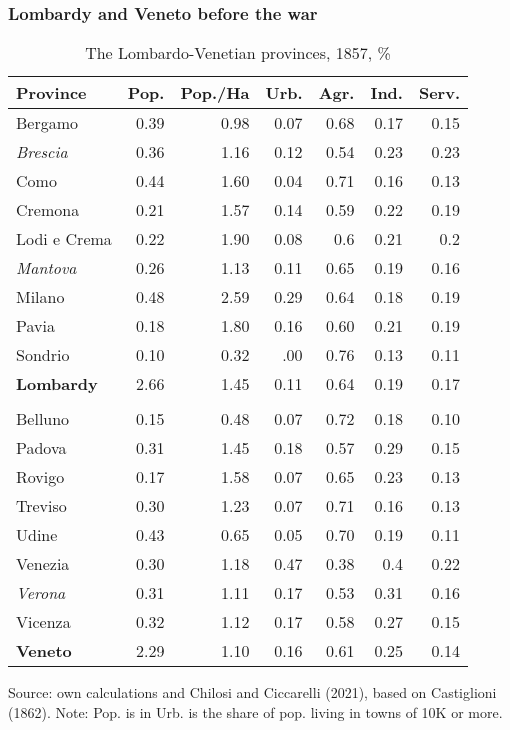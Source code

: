 \documentclass[10pt]{beamer}
\begin{document}
\begin{frame}
    \frametitle{Lombardy and Veneto before the war}

\begin{table}[!h]
\caption{The Lombardo-Venetian provinces, 1857, \%}
\centering
\fontsize{8}{8}\selectfont

    \begin{tabular}{l r r r r r r}  
        \toprule
        Province & Pop. & Pop./Ha & Urb. & Agr. & Ind. & Serv.    \\ 
        \midrule
        Bergamo & 0.39 & 0.98 & 0.07 & 0.68 & 0.17 & 0.15 \\
        \textit{Brescia} & 0.36 & 1.16 & 0.12 & 0.54 & 0.23 & 0.23 \\
        Como & 0.44 & 1.60 & 0.04 & 0.71 & 0.16 & 0.13 \\
        Cremona & 0.21 & 1.57 & 0.14 & 0.59 & 0.22 & 0.19 \\
        Lodi e Crema & 0.22 & 1.90 & 0.08 & 0.6 & 0.21 & 0.2 \\
        \textit{Mantova} & 0.26 & 1.13 & 0.11 & 0.65 & 0.19 & 0.16 \\
        Milano & 0.48 & 2.59 & 0.29 & 0.64 & 0.18 & 0.19 \\
        Pavia & 0.18 & 1.80 & 0.16 & 0.60 & 0.21 & 0.19 \\
        Sondrio & 0.10 & 0.32 & .00 & 0.76 & 0.13 & 0.11 \\
        \textbf{Lombardy} & 2.66 & 1.45 & 0.11 & 0.64 & 0.19 & 0.17 \\
         &  & &  &  &  \\
        Belluno & 0.15 & 0.48 & 0.07 & 0.72 & 0.18 & 0.10 \\
        Padova & 0.31 &1.45 & 0.18 & 0.57 & 0.29 & 0.15 \\
        Rovigo & 0.17 & 1.58 & 0.07 & 0.65 & 0.23 & 0.13 \\
        Treviso & 0.30 & 1.23 & 0.07 & 0.71 & 0.16 & 0.13 \\
        Udine & 0.43 & 0.65 & 0.05 & 0.70 & 0.19 & 0.11 \\
        Venezia & 0.30 & 1.18 & 0.47 & 0.38 & 0.4 & 0.22 \\
        \textit{Verona} & 0.31 & 1.11 & 0.17 & 0.53 & 0.31 & 0.16 \\
        Vicenza & 0.32 & 1.12 & 0.17 & 0.58 & 0.27 & 0.15 \\
        \textbf{Veneto} & 2.29 & 1.10 & 0.16 & 0.61 & 0.25 & 0.14 \\
        \bottomrule    
    \end{tabular}
    
    Source: own calculations and Chilosi and Ciccarelli (2021), based on Castiglioni (1862). Note: Pop. is in Urb. is the share of pop. living in towns of 10K or more.

\end{table}

   
\end{frame}
\end{document}
